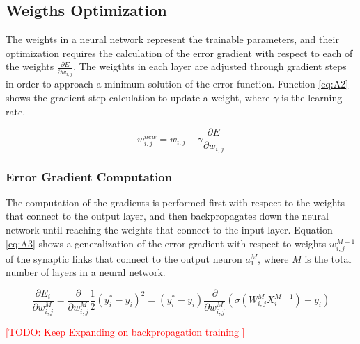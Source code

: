 \subsection{Weigths Optimization}
The weights in a neural network represent the trainable parameters, and their optimization requires the calculation of the error gradient with respect to each of the weights $\frac{\partial E}{\partial w_{i,j}}$. The weigthts in each layer are adjusted through gradient steps in order to approach a minimum solution of the error function. Function \ref{eq:A2} shows the gradient step calculation to update a weight, where $\gamma$ is the learning rate.

\begin{equation}\label{eq:A2}
	w^{new}_{i,j} = w_{i,j} - \gamma \frac{\partial E}{\partial w_{i,j}}
\end{equation}

\subsubsection{Error Gradient Computation}
The computation of the gradients is performed first with respect to the weights that connect to the output layer, and then backpropagates down the neural network until reaching the weights that connect to the input layer. Equation \ref{eq:A3} shows a generalization of the error gradient with respect to weights $w^{M-1}_{i,j}$ of the synaptic links that connect to the output neuron $a^{M}_{1}$, where $M$ is the total number of layers in a neural network.

\begin{equation}\label{eq:A3}
\frac{\partial E_i}{\partial w^{M}_{i,j}} = \frac{\partial}{\partial w^{M}_{i,j}} \frac{1}{2}(y_i^* - y_i)^2 = (y_i^* - y_i)\frac{\partial}{\partial w^{M}_{i,j}} (\sigma(W^{M}_{i,j} X^{M-1}_i) - y_i)
\end{equation}

\textcolor{red} {[TODO: Keep Expanding on backpropagation training ] }




